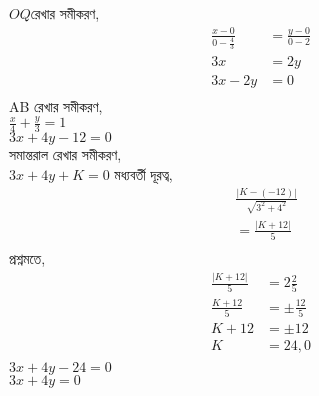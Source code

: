 \documentclass{article}
\begin{document}
$OQ$রেখার সমীকরণ, \\
\begin{align*}
	\frac{x-0}{0-\frac{4}{3}}&=\frac{y-0}{0-2}\\
	3x&=2y\\
	3x-2y&=0\\
\end{align*}
AB রেখার সমীকরণ,\\ 
$\frac{x}{4}+\frac{y}{3}=1$\\
$3x+4y-12=0$\\ 
সমান্তরাল রেখার সমীকরণ,\\
$3x+4y+K=0$
মধ্যবর্তী দূরত্ব,\\
\begin{align*}
	&\frac{|K-(-12)|}{\sqrt{3^2+4^2}}\\
	&=\frac{|K+12|}{5}\\
\end{align*}
প্রশ্নমতে,\\
\begin{align*}
	\frac{|K+12|}{5}&=2\frac{2}{5}\\
	\frac{K+12}{5}&=\pm\frac{12}{5}\\
     K+12&=\pm12\\
	K&=24,0\\
\end{align*}
$3x+4y-24=0$\\
$3x+4y=0$\\
\end{document}
